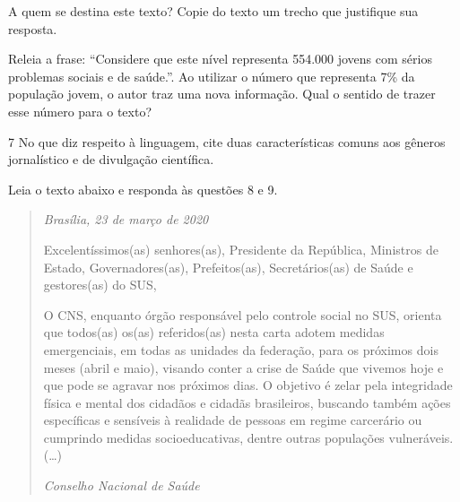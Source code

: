 


\begin{escolha}
  \item A quem se destina este texto? Copie do texto um trecho que justifique
  sua resposta.

\item{}

  \item Releia a frase: ``Considere que este nível representa 554.000 jovens
  com sérios problemas sociais e de saúde.''. Ao utilizar o número que
  representa 7\% da população jovem, o autor traz uma nova informação.
  Qual o sentido de trazer esse número para o texto?

\item{}

\end{escolha}

\num{7} No que diz respeito à linguagem, cite duas características comuns aos gêneros
jornalístico e de divulgação científica.


Leia o texto abaixo e responda às questões 8 e 9. 

\begin{quote}

\emph{Brasília, 23 de março de 2020}

Excelentíssimos(as) senhores(as), Presidente da República, Ministros de
Estado, Governadores(as), Prefeitos(as), Secretários(as) de Saúde e
gestores(as) do SUS,

O CNS, enquanto órgão responsável pelo controle social no SUS, orienta
que todos(as) os(as) referidos(as) nesta carta adotem medidas
emergenciais, em todas as unidades da federação, para os próximos dois
meses (abril e maio), visando conter a crise de Saúde que vivemos hoje e
que pode se agravar nos próximos dias. O objetivo é zelar pela
integridade física e mental dos cidadãos e cidadãs brasileiros, buscando
também ações específicas e sensíveis à realidade de pessoas em regime
carcerário ou cumprindo medidas socioeducativas, dentre outras
populações vulneráveis. (\ldots{})

\emph{Conselho Nacional de Saúde} 

\end{quote} 

